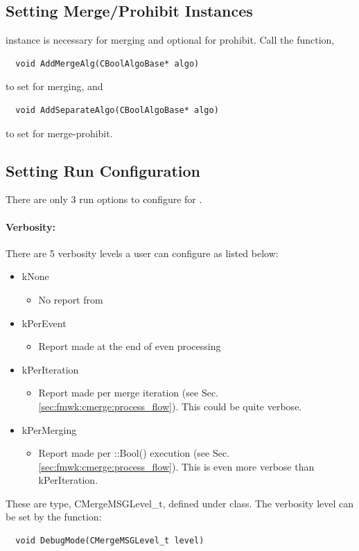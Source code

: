 \subsection{Setting Merge/Prohibit {\cmalgo} Instances}
{\cmalgo} instance is necessary for merging and optional for prohibit. Call the function,
\begin{lstlisting}
  void AddMergeAlg(CBoolAlgoBase* algo)
\end{lstlisting}
to set {\cmalgo} for merging, and 
\begin{lstlisting}
  void AddSeparateAlgo(CBoolAlgoBase* algo)
\end{lstlisting}
to set {\cmalgo} for merge-prohibit.

\subsection{Setting Run Configuration}
There are only 3 run options to configure for {\cmerge}.

\paragraph{Verbosity:} 
There are 5 verbosity levels a user can configure as listed below:
\begin{itemize}
\item[] {\ttfamily kNone}
  \begin{itemize}
    \item No report from {\cmerge}
  \end{itemize}

\item[] {\ttfamily kPerEvent}
  \begin{itemize}
    \item Report made at the end of even processing
  \end{itemize}

\item[] {\ttfamily kPerIteration}
  \begin{itemize}
    \item Report made per merge iteration (see Sec.\ref{sec:fmwk:cmerge:process_flow}). This could be quite verbose.      
  \end{itemize}

\item[] {\ttfamily kPerMerging}
  \begin{itemize}
    \item Report made per {\cmalgo::Bool()} execution (see Sec.\ref{sec:fmwk:cmerge:process_flow}). This is even more verbose than {\ttfamily kPerIteration}.
  \end{itemize}

\end{itemize}
These are {\enum} type, {\ttfamily CMergeMSGLevel\_t}, defined under {\cmerge} class. 
The verbosity level can be set by the function:
\begin{lstlisting}
  void DebugMode(CMergeMSGLevel_t level)
\end{lstlisting}

